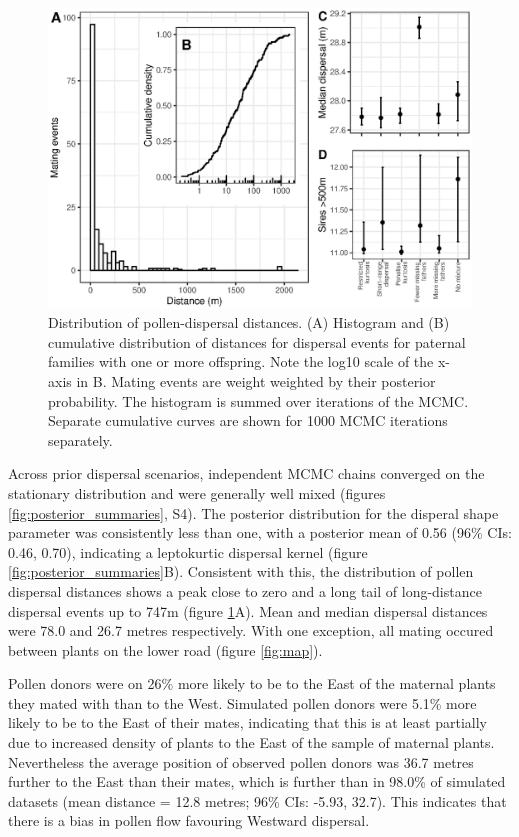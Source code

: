 \documentclass[10pt, a4paper, twocolumn]{article} %
\begin{document}
\begin{figure}
    \centering
    \includegraphics{dispersal.eps}
    \caption{
        Distribution of pollen-dispersal distances.
        (A) Histogram and (B) cumulative distribution of distances for dispersal events for paternal families with one or more offspring.
        Note the log10 scale of the x-axis in B.
        Mating events are weight weighted by their posterior probability.
        The histogram is summed over iterations of the MCMC.
        Separate cumulative curves are shown for 1000 MCMC iterations separately.
    }
    \label{fig:dispersal}
\end{figure}

Across prior dispersal scenarios, independent MCMC chains converged on the stationary distribution and were generally well mixed (figures \ref{fig:posterior_summaries}, S4).
The posterior distribution for the disperal shape parameter was consistently less than one, with a posterior mean of 0.56 (96\% CIs: 0.46, 0.70), indicating a leptokurtic dispersal kernel (figure \ref{fig:posterior_summaries}B).
Consistent with this, the distribution of pollen dispersal distances shows a peak close to zero and a long tail of long-distance dispersal events up to 747m (figure \ref{fig:dispersal}A).
Mean and median dispersal distances were 78.0 and 26.7 metres respectively.
With one exception, all mating occured between plants on the lower road (figure \ref{fig:map}).

Pollen donors were on 26\% more likely to be to the East of the maternal plants they mated with than to the West.
Simulated pollen donors were 5.1\% more likely to be to the East of their mates, indicating that this is at least partially due to increased density of plants to the East of the sample of maternal plants.
Nevertheless the average position of observed pollen donors was 36.7 metres further to the East than their mates, which is further than in 98.0\% of simulated datasets (mean distance = 12.8 metres; 96\% CIs: -5.93, 32.7).
This indicates that there is a bias in pollen flow favouring Westward dispersal.
\end{document}
